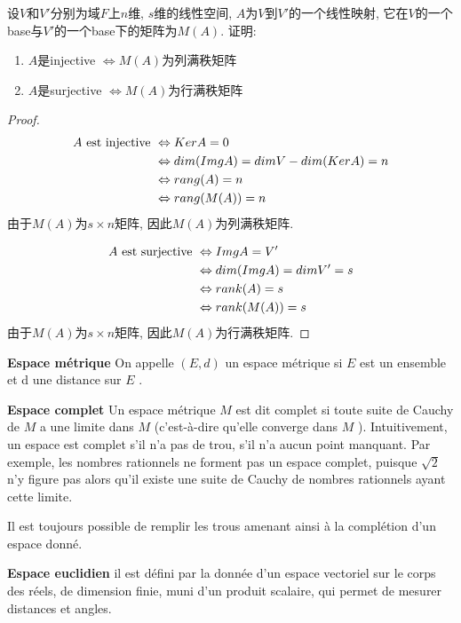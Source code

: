 \documentclass{book}
\begin{document}
\begin{example}
设$V$和$V'$分别为域$F$上$n$维, $s$维的线性空间, $A$为$V$到$V'$的一个线性映射, 它在$V$的一个base与$V'$的一个base下的矩阵为$M(A)$.
证明:
\begin{enumerate}
\item $A$是injective $\Leftrightarrow M(A)$为列满秩矩阵
\item $A$是surjective $\Leftrightarrow M(A)$为行满秩矩阵
\end{enumerate}
\end{example}
\begin{proof}
$$
\begin{aligned}
A \text{ est injective } & \Leftrightarrow Ker A = 0 \\
& \Leftrightarrow dim(Img A) = dim V - dim(Ker A) = n \\
& \Leftrightarrow rang(A) = n \\
& \Leftrightarrow rang(M(A)) = n
\end{aligned}
$$
由于$M(A)$为$s \times n$矩阵, 因此$M(A)$为列满秩矩阵.

$$
\begin{aligned}
A \text{ est surjective } & \Leftrightarrow Img A = V' \\
& \Leftrightarrow dim(Img A) = dim V' = s \\
& \Leftrightarrow rank(A) = s \\
& \Leftrightarrow rank(M(A)) = s \\
\end{aligned}
$$
由于$M(A)$为$s \times n$矩阵, 因此$M(A)$为行满秩矩阵.
\end{proof}

\textbf{Espace m\'etrique}
On appelle $(E, d)$ un espace m\'etrique si $ E$  est un ensemble et d une distance sur $E$ .

\textbf{Espace complet}
Un espace m\'etrique $ M$  est dit complet si toute suite de Cauchy de $ M$  a une limite dans $ M$  (c'est-\`a-dire qu'elle converge dans $M$ ).\newline
Intuitivement, un espace est complet s'il n'a pas de trou, s'il n'a aucun point manquant. \newline
Par exemple, les nombres rationnels ne forment pas un espace complet,
puisque $\sqrt{2}$ n'y figure pas alors qu'il existe une suite de Cauchy de nombres rationnels ayant cette limite.

Il est toujours possible de remplir les trous amenant ainsi \`a la compl\'etion d'un espace donn\'e.

\textbf{Espace euclidien}
il est d\'efini par la donn\'ee d'un espace vectoriel sur le corps des r\'eels, de dimension finie, muni d'un produit scalaire,
qui permet de mesurer distances et angles.
\end{document}
